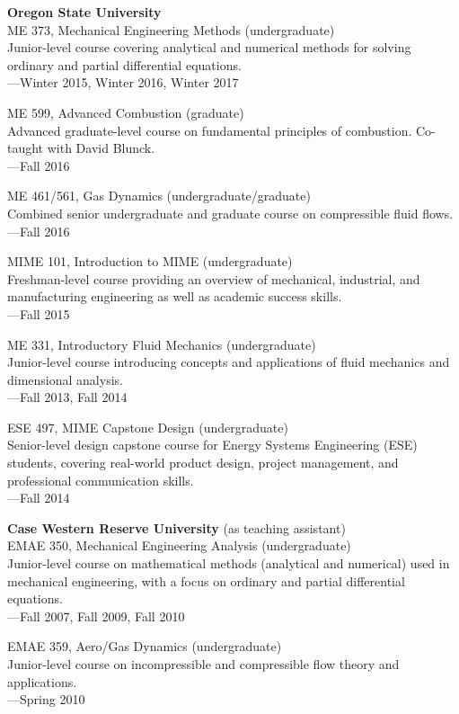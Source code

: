 \documentclass[margin,line,11pt]{res}
\begin{document}
\begin{resume}
\textbf{Oregon State University} \\
ME 373, Mechanical Engineering Methods (undergraduate) \\
Junior-level course covering analytical and numerical methods for solving ordinary and partial differential equations. \\
---Winter 2015, Winter 2016, Winter 2017

ME 599, Advanced Combustion (graduate) \\
Advanced graduate-level course on fundamental principles of combustion. Co-taught with David Blunck.\\
---Fall 2016

ME 461\slash 561, Gas Dynamics (undergraduate\slash graduate) \\
Combined senior undergraduate and graduate course on compressible fluid flows. \\
---Fall 2016

MIME 101, Introduction to MIME (undergraduate) \\
Freshman-level course providing an overview of mechanical, industrial, and manufacturing engineering as well as academic success skills. \\
---Fall 2015

ME 331, Introductory Fluid Mechanics (undergraduate) \\
Junior-level course introducing concepts and applications of fluid mechanics and dimensional analysis. \\
---Fall 2013, Fall 2014

ESE 497, MIME Capstone Design (undergraduate) \\
Senior-level design capstone course for Energy Systems Engineering (ESE) students, covering real-world product design, project management, and professional communication skills. \\
---Fall 2014

\textbf{Case Western Reserve University} (as teaching assistant) \\
EMAE 350, Mechanical Engineering Analysis (undergraduate) \\
Junior-level course on mathematical methods (analytical and numerical) used in mechanical engineering, with a focus on ordinary and partial differential equations. \\
---Fall 2007, Fall 2009, Fall 2010

EMAE 359, Aero\slash Gas Dynamics (undergraduate) \\
Junior-level course on incompressible and compressible flow theory and applications. \\
---Spring 2010


\end{resume}
\end{document}
